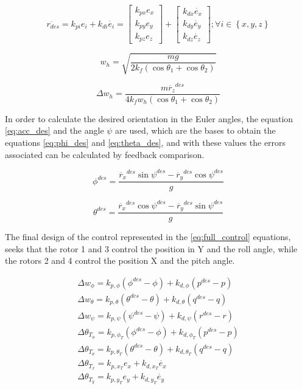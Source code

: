 \documentclass[a4paper, 12pt, oneside]{book}
\begin{document}
\begin{equation}
\ddot{r_{des}}=k_{pi}e_i+k_{di}\dot{e_i}=
\begin{bmatrix}
k_{px}e_x\\ 
k_{py}e_y\\ 
k_{pz}e_z
\end{bmatrix}
+
\begin{bmatrix}
k_{dx}\dot{e_x}\\ 
k_{dy}\dot{e_y}\\ 
k_{dz}\dot{e_z}
\end{bmatrix}
;
\forall i \in \left \{ x, y, z \right \}
\label{eq:acc_des}
\end{equation}

\begin{equation}
w_h=\sqrt{\frac{mg}{2k_f(\cos\theta_1+\cos\theta_2)}}
\label{eq:w}
\end{equation}

\begin{equation}
\Delta w_h=\frac{m\ddot{r_z}^{des}}{4k_fw_h(\cos\theta_1+\cos\theta_2)}
\label{eq:dw}
\end{equation}

In order to calculate the desired orientation in the Euler angles, the equation \ref{eq:acc_des} and the angle $\psi$ are used, which are the bases to obtain the equations \ref{eq:phi_des} and \ref{eq:theta_des}, and with these values the errors associated can be calculated by feedback comparison.

\begin{equation}
\phi^{des}=\frac{\ddot{r_x}^{des}\sin\psi^{des}-\ddot{r_y}^{des}\cos\psi^{des}}{g}
\label{eq:phi_des}
\end{equation}

\begin{equation}
\theta^{des}=\frac{\ddot{r_x}^{des}\cos\psi^{des}-\ddot{r_y}^{des}\sin\psi^{des}}{g}
\label{eq:theta_des}
\end{equation}

The final design of the control represented in the \ref{eq:full_control} equations, seeks that the rotor 1 and 3 control the position in Y and the roll angle, while the rotors 2 and 4 control the position X and the pitch angle.

\begin{equation}
\begin{split}
\Delta w_\phi=k_{p,\phi}(\phi^{des}-\phi)+k_{d,\phi}(p^{des}-p)\\
\Delta w_\theta=k_{p,\theta}(\theta^{des}-\theta)+k_{d,\theta}(q^{des}-q)\\
\Delta w_\psi=k_{p,\psi}(\psi^{des}-\psi)+k_{d,\psi}(r^{des}-r)\\
\Delta \theta_{T_\phi}=k_{p,\phi_T}(\phi^{des}-\phi)+k_{d,\phi_T}(p^{des}-p)\\
\Delta \theta_{T_\theta}=k_{p,\theta_T}(\theta^{des}-\theta)+k_{d,\theta_T}(q^{des}-q)\\
\Delta \theta_{T_x}=k_{p,x_T}e_x+k_{d,x_T}\dot{e_x}\\
\Delta \theta_{T_y}=k_{p,y_T}e_y+k_{d,y_T}\dot{e_y}
\end{split}
\label{eq:full_control}
\end{equation}
\end{document}
